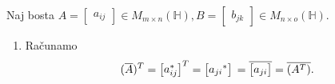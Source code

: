 \documentclass[mat1, tisk]{fmfdelo}
\numberwithin{equation}{section}
\begin{document}
\begin{dokaz}
    Naj bosta $A = 
        \begin{bmatrix}
            a_{ij}
        \end{bmatrix}
        \in M_{m \times n}(\mathbb{H}),
        B = 
        \begin{bmatrix}
            b_{jk}
        \end{bmatrix}
        \in M_{n \times o}(\mathbb{H})$.

    \begin{enumerate}
        \item Računamo
        \begin{equation*}
            (\overline{A})^{T} = 
                \begin{bmatrix}
                    a_{ij}^{*}
                \end{bmatrix}^{T} 
                = 
                \begin{bmatrix}
                    {a_{ji}}^{*} 
                \end{bmatrix} \\
                = \overline{
                \begin{bmatrix}
                    a_{ji}
                \end{bmatrix}} \\
                = \overline{(A^{T})}.
        \end{equation*}


\end{enumerate}
\end{dokaz}
\end{document}
